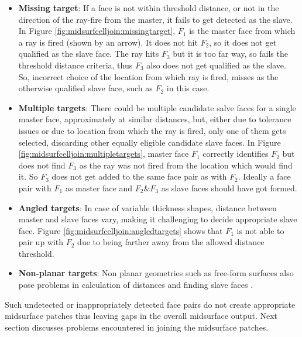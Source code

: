 
\begin{itemize}[noitemsep,topsep=2pt,parsep=2pt,partopsep=2pt]
\item \textbf{Missing target}: If a face is not within threshold distance, or not in the direction of the ray-fire from the master, it fails to get detected as the slave. In Figure \ref{fig:midsurfcelljoin:missingtarget}, $F_1$ is the master face from which a ray is fired (shown by an arrow). It does not hit $F_2$, so it does not get qualified as the slave face. The ray hits $F_3$ but it is too far way, so fails the threshold distance criteria, thus $F_3$ also does not get qualified as the slave. So, incorrect choice of the location from which ray is fired, misses as the otherwise qualified slave face, such as $F_2$ in this case.
\item \textbf{Multiple targets}: There could be multiple candidate salve faces for a single master face, approximately at similar distances, but, either due to tolerance issues or due to location from which the ray is fired, only one of them gets selected, discarding other equally eligible candidate slave faces. In Figure \ref{fig:midsurfcelljoin:multipletargets}, master face $F_1$ correctly identifies $F_2$ but does not find $F_3$ as the ray was not fired from the location which would find it. So $F_3$ does not get added to the same face pair as with $F_2$. Ideally a face pair with $F_1$ as master face and $F_2 \& F_3$ as slave faces should have got formed.
\item \textbf{Angled targets}: In case of variable thickness shapes, distance between master and slave faces vary, making it challenging to decide appropriate slave face. Figure \ref{fig:midsurfcelljoin:angledtargets} shows that $F_1$ is not able to pair up with $F_2$ due to being farther away from the allowed distance threshold.
\item \textbf{Non-planar targets}: Non planar geometries such as free-form surfaces also pose problems in calculation of distances and finding slave faces \cite{Zhu2016}.
\end{itemize}

Such undetected or inappropriately detected face pairs do not create appropriate midsurface patches thus leaving gaps in the overall midsurface output. Next section discusses problems encountered in joining the midsurface patches.

